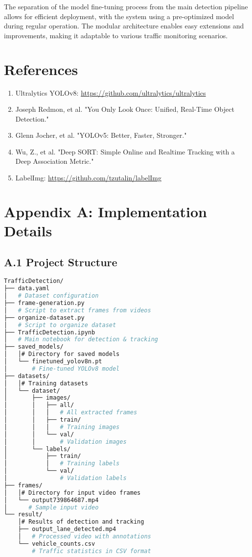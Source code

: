 \documentclass[9pt,a4paper,twoside]{rho-class/rho}
\begin{document}
    The separation of the model fine-tuning process from the main detection pipeline allows for efficient deployment, with the system using a pre-optimized model during regular operation. The modular architecture enables easy extensions and improvements, making it adaptable to various traffic monitoring scenarios.

\section{References}

    \begin{enumerate}
        \item Ultralytics YOLOv8: \url{https://github.com/ultralytics/ultralytics}
        \item Joseph Redmon, et al. "You Only Look Once: Unified, Real-Time Object Detection."
        \item Glenn Jocher, et al. "YOLOv5: Better, Faster, Stronger."
        \item Wu, Z., et al. "Deep SORT: Simple Online and Realtime Tracking with a Deep Association Metric."
        \item LabelImg: \url{https://github.com/tzutalin/labelImg}
    \end{enumerate}
\newpage
\section*{Appendix A: Implementation Details}

    \subsection*{A.1 Project Structure}
    
    \begin{lstlisting}[caption=Project directory structure, language=bash]
TrafficDetection/
├── data.yaml                  
│   # Dataset configuration
├── frame-generation.py        
│   # Script to extract frames from videos
├── organize-dataset.py        
│   # Script to organize dataset
├── TrafficDetection.ipynb     
│   # Main notebook for detection & tracking
├── saved_models/              
│   │# Directory for saved models
│   └── finetuned_yolov8n.pt   
│       # Fine-tuned YOLOv8 model
├── datasets/                  
│   │# Training datasets
│   └── dataset/
│       ├── images/
│       │   ├── all/           
│       │   │   # All extracted frames
│       │   ├── train/         
│       │   │   # Training images
│       │   └── val/           
│       │       # Validation images
│       └── labels/
│           ├── train/         
│           │   # Training labels
│           └── val/           
│               # Validation labels
├── frames/                    
│   │# Directory for input video frames
│   └── output739864687.mp4    
│      # Sample input video
└── result/                    
    │# Results of detection and tracking
    ├── output_lane_detected.mp4  
    │   # Processed video with annotations
    └── vehicle_counts.csv     
        # Traffic statistics in CSV format
    \end{lstlisting}
    
\end{document}
